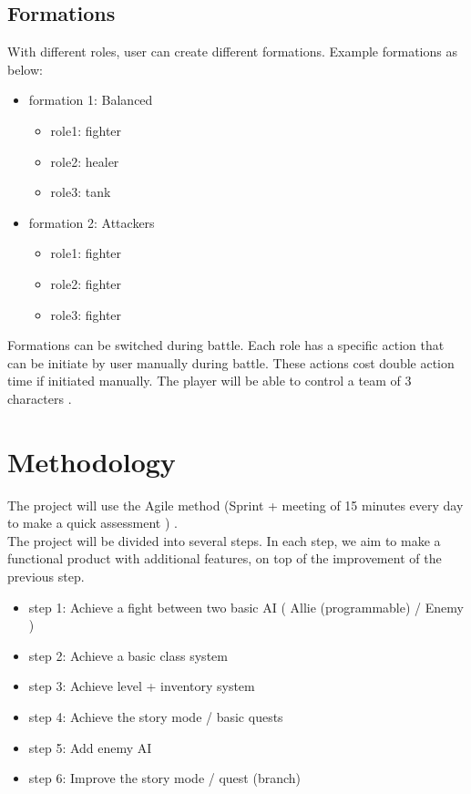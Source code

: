 \documentclass[16pt, oneside]{report}
\begin{document}
\section{Formations}
With different roles, user can create different formations. Example formations as below:\\
\begin{itemize}
	\item formation 1: Balanced
		\begin{itemize}
			\item role1: fighter
			\item	role2: healer
			\item role3: tank
		\end{itemize}
	\item formation 2: Attackers
		\begin{itemize}
			\item role1: fighter
			\item	role2: fighter
			\item role3: fighter\\
		\end{itemize}
\end{itemize}
Formations can be switched during battle. Each role has a specific action that can be initiate by user manually during battle. These actions cost double action time if initiated manually.
The player will be able to control a team of 3 characters . \\

\chapter{Methodology}
The project will use the Agile method (Sprint + meeting of 15 minutes every day to make a quick assessment ) . \\
The project will be divided into several steps. In each step, we aim to make a functional product with additional features,  on top of the improvement of the previous step.\\
\begin{itemize}
\item step 1: Achieve a fight between two basic AI ( Allie (programmable) / Enemy )
\item step 2: Achieve a basic class system
\item step 3: Achieve level + inventory system
\item step 4: Achieve the story mode / basic quests
\item step 5: Add enemy AI
\item step 6: Improve the story mode / quest (branch)\\
\end{itemize}
\end{document}
